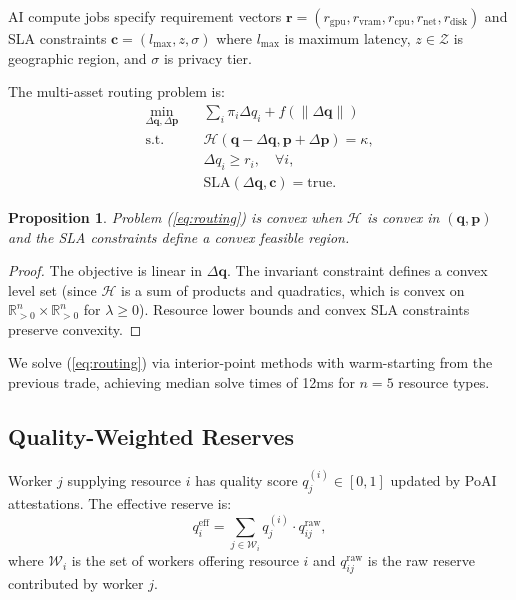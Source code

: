 \documentclass[11pt,twocolumn]{article}
\newtheorem{proposition}[theorem]{Proposition}
\begin{document}
AI compute jobs specify requirement vectors $\bm{r} = (r_{\text{gpu}}, r_{\text{vram}}, r_{\text{cpu}}, r_{\text{net}}, r_{\text{disk}})$ and SLA constraints $\bm{c} = (l_{\max}, z, \sigma)$ where $l_{\max}$ is maximum latency, $z \in \mathcal{Z}$ is geographic region, and $\sigma$ is privacy tier.

The multi-asset routing problem is:
\begin{align}
\min_{\Delta\bm{q}, \Delta\bm{p}} \quad & \sum_i \pi_i \Delta q_i + f(\|\Delta\bm{q}\|) \label{eq:routing} \\
\text{s.t.} \quad & \mathcal{H}(\bm{q} - \Delta\bm{q}, \bm{p} + \Delta\bm{p}) = \kappa, \nonumber \\
& \Delta q_i \ge r_i, \quad \forall i, \nonumber \\
& \text{SLA}(\Delta\bm{q}, \bm{c}) = \text{true}. \nonumber
\end{align}

\begin{proposition}
Problem (\ref{eq:routing}) is convex when $\mathcal{H}$ is convex in $(\bm{q}, \bm{p})$ and the SLA constraints define a convex feasible region.
\end{proposition}

\begin{proof}
The objective is linear in $\Delta\bm{q}$. The invariant constraint defines a convex level set (since $\mathcal{H}$ is a sum of products and quadratics, which is convex on $\mathbb{R}^n_{>0} \times \mathbb{R}^n_{>0}$ for $\lambda \ge 0$). Resource lower bounds and convex SLA constraints preserve convexity.
\end{proof}

We solve (\ref{eq:routing}) via interior-point methods with warm-starting from the previous trade, achieving median solve times of 12ms for $n = 5$ resource types.

\subsection{Quality-Weighted Reserves}

Worker $j$ supplying resource $i$ has quality score $q_j^{(i)} \in [0, 1]$ updated by PoAI attestations. The effective reserve is:
\begin{equation}
q_i^{\text{eff}} = \sum_{j \in \mathcal{W}_i} q_j^{(i)} \cdot q_{ij}^{\text{raw}},
\end{equation}
where $\mathcal{W}_i$ is the set of workers offering resource $i$ and $q_{ij}^{\text{raw}}$ is the raw reserve contributed by worker $j$.
\end{document}

